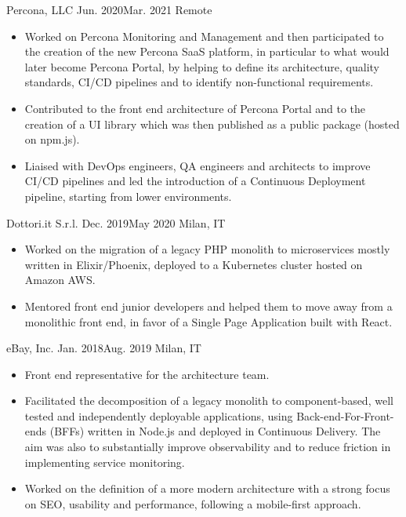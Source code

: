 \documentclass{resume}
\begin{document}
\begin{cvsection}
        {Percona, LLC}%
        {Jun. 2020}{Mar. 2021}%
        {Remote}%
        {%
            \begin{itemize}
                \item Worked on Percona Monitoring and Management and then
                    participated to the creation of the new Percona SaaS
                    platform, in particular to what would later become
                    Percona Portal, by helping to define its architecture,
                    quality standards, CI/CD pipelines and to identify
                    non-functional requirements.
                \item Contributed to the front end architecture of Percona
                    Portal and to the creation of a UI library which was then
                    published as a public package (hosted on npm.js).
                \item Liaised with DevOps engineers, QA engineers and architects
                    to improve CI/CD pipelines and led the introduction of a
                    Continuous Deployment pipeline, starting from lower
                    environments.
            \end{itemize}
        }

        {Dottori.it S.r.l.}%
        {Dec. 2019}{May 2020}%
        {Milan, IT}%
        {%
            \begin{itemize}
                \item Worked on the migration of a legacy PHP monolith to
                    microservices mostly written in Elixir/Phoenix, deployed to
                    a Kubernetes cluster hosted on Amazon AWS.
                \item Mentored front end junior developers and helped them to
                    move away from a monolithic front end, in favor of a Single
                    Page Application built with React.
            \end{itemize}
        }

        {eBay, Inc.}%
        {Jan. 2018}{Aug. 2019}%
        {Milan, IT}%
        {%
            \begin{itemize}
                \item Front end representative for the architecture team.
                \item Facilitated the decomposition of a legacy monolith to
                    component-based, well tested and independently deployable
                    applications, using Back-end-For-Front-ends (BFFs) written
                    in Node.js and deployed in Continuous Delivery. The aim was
                    also to substantially improve observability and to reduce
                    friction in implementing service monitoring.
                \item Worked on the definition of a more modern architecture
                    with a strong focus on SEO, usability and performance,
                    following a mobile-first approach.
            \end{itemize}
        }


\end{cvsection}
\end{document}
